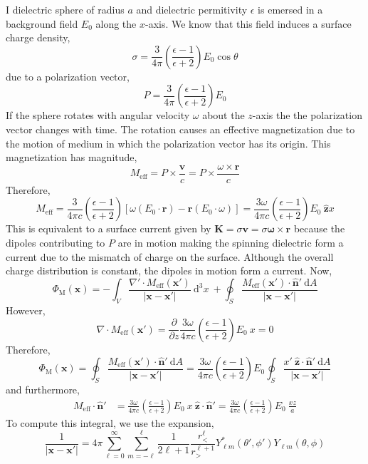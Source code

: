 \documentclass[12pt]{extarticle}
\renewcommand{\d}[1]{\: \mathrm{d}#1}
\newcommand{\dn}[2]{\: \mathrm{d}^{#1} #2 \:}
\newcommand{\pderiv}[2]{\frac{\partial{#1}}{\partial{#2}}}
\renewcommand{\bf}[1]{\mathbf{#1}}
\theoremstyle{definition}
\begin{document}
I dielectric sphere of radius $a$ and dielectric permitivity $\epsilon$ is emersed in a background field $E_0$ along the $x$-axis. We know that this field induces a surface charge density,
\[ \sigma = \frac{3}{4 \pi} \left( \frac{\epsilon - 1}{\epsilon + 2} \right) E_0 \cos{\theta} \]
due to a polarization vector,
\[ P = \frac{3}{4 \pi} \left( \frac{\epsilon - 1}{\epsilon + 2} \right) E_0 \]
If the sphere rotates with angular velocity $\omega$ about the $z$-axis the the polarization vector changes with time. The rotation causes an effective magnetization due to the motion of medium in which the polarization vector has its origin. This magnetization has magnitude,
\[ M_{\text{eff}} = P \times \frac{\bf{v}}{c} = P \times \frac{\omega \times \bf{r}}{c} \]
Therefore,
\[ M_{\text{eff}} = \frac{3}{4 \pi c} \left( \frac{\epsilon - 1}{\epsilon + 2} \right) [ \omega (E_0 \cdot \bf{r}) - \bf{r} (E_0 \cdot \omega)] = \frac{3 \omega}{4 \pi c} \left( \frac{\epsilon - 1}{\epsilon + 2} \right) E_0 \: \hat{\bf{z}} x \]
This is equivalent to a surface current given by $\bf{K} = \sigma \bf{v} = \sigma \bf{\omega} \times \bf{r}$ because the dipoles contributing to $P$ are in motion making the spinning dielectric form a current due to the mismatch of charge on the surface. Although the overall charge distribution is constant, the dipoles in motion form a current. Now, 
\[ \Phi_{\text{M}}(\bf{x}) = - \int_V \frac{\nabla' \cdot M_{\text{eff}}(\bf{x}')}{|\bf{x} - \bf{x}'|} \dn{3}{x} + \oint_S  \frac{M_{\text{eff}}(\bf{x}') \cdot \hat{\bf{n}}' \d{A}}{|\bf{x} - \bf{x}'|} \] 
However,
\[ \nabla \cdot M_{\text{eff}}(\bf{x}') = \pderiv{}{z} \frac{3 \omega}{4 \pi c} \left( \frac{\epsilon - 1}{\epsilon + 2} \right) E_0 \: x = 0  \]
Therefore, 
\[ \Phi_{\text{M}}(\bf{x}) = \oint_S  \frac{M_{\text{eff}}(\bf{x}') \cdot \hat{\bf{n}}' \d{A}}{|\bf{x} - \bf{x}'|} = \frac{3 \omega}{4 \pi c} \left( \frac{\epsilon - 1}{\epsilon + 2} \right) E_0 \oint_S \frac{x' \: \hat{\bf{z}} \cdot \hat{\bf{n}}' \d{A}}{|\bf{x} - \bf{x}'|} \]
and furthermore,
\begin{align*}
 M_{\text{eff}} \cdot \hat{\bf{n}}' & = \frac{3 \omega}{4 \pi c} \left( \frac{\epsilon - 1}{\epsilon + 2} \right) E_0 \: x \: \hat{\bf{z}} \cdot \hat{\bf{n}}' 
= \frac{3 \omega}{4 \pi c} \left( \frac{\epsilon - 1}{\epsilon + 2} \right) E_0 \: \frac{xz}{a}
\end{align*}
To compute this integral, we use the expansion,
\[ \frac{1}{|\bf{x} - \bf{x}'|} = 4 \pi \sum_{\ell = 0}^{\infty} \sum_{m = - \ell}^{\ell} \frac{1}{2 \ell + 1} \frac{r_{<}^\ell}{r_{>}^{\ell + 1}} Y^*_{\ell m}(\theta', \phi') Y_{\ell m}(\theta, \phi) \]
\end{document}
